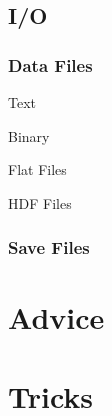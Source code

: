 \documentclass{article}
\begin{document}
\subsection{I/O}
\subsubsection{Data Files}
\bi
  \item Text
  \item Binary
   \bi
     \item Flat Files
     \item HDF Files
   \ei
\ei
\subsubsection{Save Files}
\section{Advice}
\section{Tricks}
\end{document}

